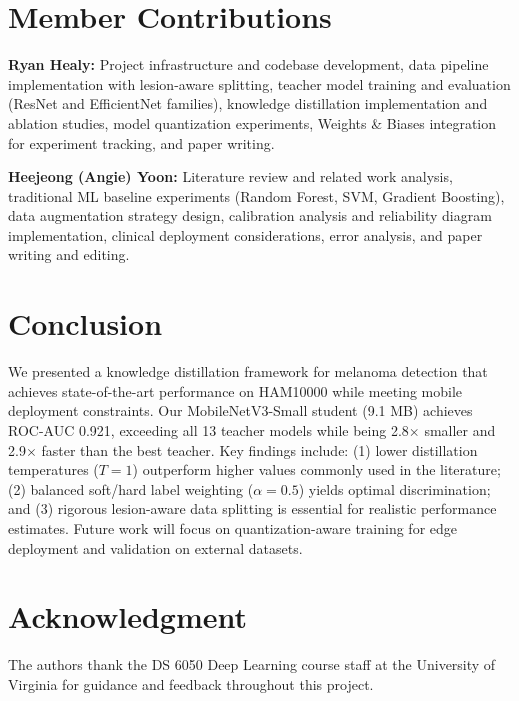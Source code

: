 \documentclass[conference]{IEEEtran}
\begin{document}
\section{Member Contributions}

\textbf{Ryan Healy:} Project infrastructure and codebase development, data pipeline implementation with lesion-aware splitting, teacher model training and evaluation (ResNet and EfficientNet families), knowledge distillation implementation and ablation studies, model quantization experiments, Weights \& Biases integration for experiment tracking, and paper writing.

\textbf{Heejeong (Angie) Yoon:} Literature review and related work analysis, traditional ML baseline experiments (Random Forest, SVM, Gradient Boosting), data augmentation strategy design, calibration analysis and reliability diagram implementation, clinical deployment considerations, error analysis, and paper writing and editing.

\section{Conclusion}

We presented a knowledge distillation framework for melanoma detection that achieves state-of-the-art performance on HAM10000 while meeting mobile deployment constraints. Our MobileNetV3-Small student (9.1 MB) achieves ROC-AUC 0.921, exceeding all 13 teacher models while being 2.8$\times$ smaller and 2.9$\times$ faster than the best teacher. Key findings include: (1) lower distillation temperatures ($T=1$) outperform higher values commonly used in the literature; (2) balanced soft/hard label weighting ($\alpha=0.5$) yields optimal discrimination; and (3) rigorous lesion-aware data splitting is essential for realistic performance estimates. Future work will focus on quantization-aware training for edge deployment and validation on external datasets.

\section*{Acknowledgment}

The authors thank the DS 6050 Deep Learning course staff at the University of Virginia for guidance and feedback throughout this project.
\end{document}
